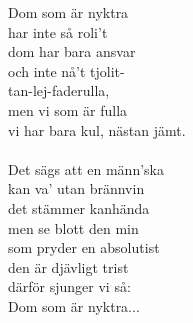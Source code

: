 
Dom som är nyktra \\ har inte så roli't \\ dom har bara ansvar \\ och inte nå't tjolit- \\ tan-lej-faderulla, \\ men vi som är fulla \\ vi har bara kul, nästan jämt. \\ \hspace{10mm} \\ Det sägs att en männ'ska \\ kan va' utan brännvin \\ det stämmer kanhända \\ men se blott den min \\ som pryder en absolutist \\ den är djävligt trist \\ därför sjunger vi så: \\ Dom som är nyktra...